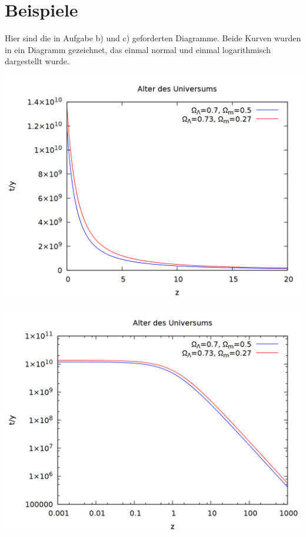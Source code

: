 \documentclass{scrreprt}
\begin{document}
\section*{Beispiele}
Hier sind die in Aufgabe b) und c) geforderten Diagramme. Beide Kurven wurden in ein Diagramm gezeichnet, das einmal normal und einmal logarithmisch dargestellt wurde.
\begin{center}
\includegraphics[scale=0.3]{4_plot_final} 
\end{center}
\begin{center}
\includegraphics[scale=0.3]{4_plot_log_final} 
\end{center}
\end{document}
